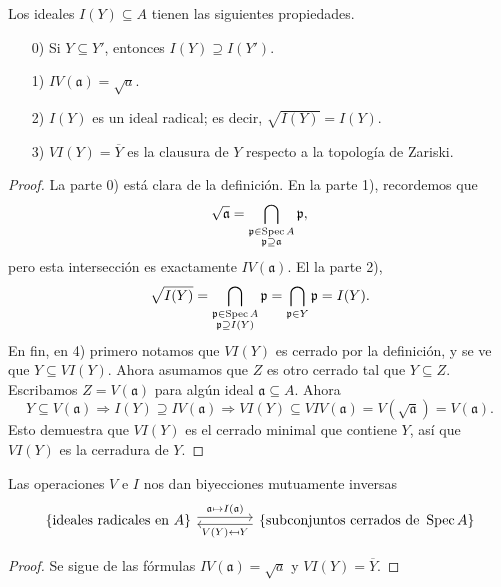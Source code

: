 \documentclass{article}
\numberwithin{equation}{section}
\theoremstyle{definition}
\begin{document}
\begin{observacion}
  Los ideales $I (Y) \subseteq A$ tienen las siguientes propiedades.

  \begin{enumerate}
  \item[0)] Si $Y \subseteq Y'$, entonces $I (Y) \supseteq I (Y')$.

  \item[1)] $IV (\mathfrak{a}) = \sqrt{a}$.

  \item[2)] $I (Y)$ es un ideal radical; es decir, $\sqrt{I (Y)} = I (Y)$.

  \item[3)] $VI (Y) = \overline{Y}$ es la clausura de $Y$ respecto a
    la topología de Zariski.
  \end{enumerate}

  \begin{proof}
    La parte 0) está clara de la definición. En la parte 1), recordemos que
    \[ \sqrt{\mathfrak{a}} =
       \bigcap_{\substack{\mathfrak{p} \in \operatorname{Spec} A \\ \mathfrak{p}\supseteq\mathfrak{a}}} \mathfrak{p}, \]
    pero esta intersección es exactamente $IV (\mathfrak{a})$. El la parte 2),
    \[ \sqrt{I (Y)} =
       \bigcap_{\substack{\mathfrak{p} \in \operatorname{Spec} A \\ \mathfrak{p} \supseteq I (Y)}} \mathfrak{p} =
       \bigcap_{\mathfrak{p} \in Y} \mathfrak{p} = I (Y). \]
    En fin, en 4) primero notamos que $VI (Y)$ es cerrado por la definición,
    y se ve que $Y \subseteq VI (Y)$. Ahora asumamos que $Z$ es otro cerrado tal
    que $Y \subseteq Z$. Escribamos $Z = V (\mathfrak{a})$ para algún ideal
    $\mathfrak{a} \subseteq A$. Ahora
    \[ Y \subseteq V (\mathfrak{a}) \Longrightarrow
       I (Y) \supseteq IV (\mathfrak{a}) \Longrightarrow
       VI (Y) \subseteq VIV (\mathfrak{a}) = V (\sqrt{\mathfrak{a}}) = V (\mathfrak{a}). \]
    Esto demuestra que $VI (Y)$ es el cerrado minimal que contiene $Y$, así que
    $VI (Y)$ es la cerradura de $Y$.
  \end{proof}
\end{observacion}

\begin{corolario}
  Las operaciones $V$ e $I$ nos dan biyecciones mutuamente inversas
  $$\begin{tikzcd}[column sep=4em]
    \{ \text{ideales radicales en }A \} \ar[shift left=0.25em]{r}{\mathfrak{a} \mapsto I (\mathfrak{a})} & \{ \text{subconjuntos cerrados de }\Spec A \} \ar[shift left=0.25em]{l}{V (Y) \mapsfrom Y} 
  \end{tikzcd}$$

  \begin{proof}
    Se sigue de las fórmulas $IV (\mathfrak{a}) = \sqrt{a}$
    y $VI (Y) = \overline{Y}$.
  \end{proof}
\end{corolario}
\end{document}

